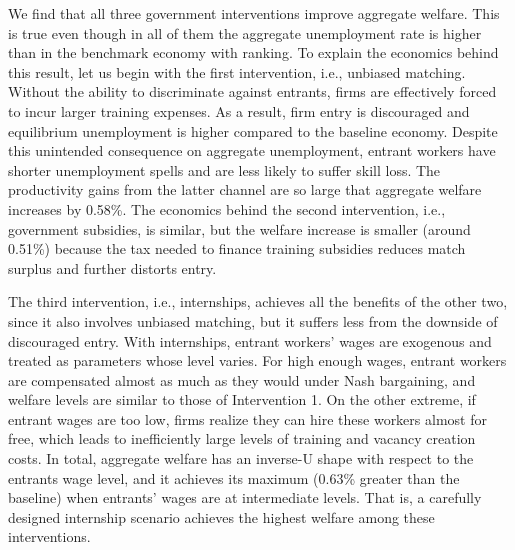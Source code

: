 \documentclass[12pt]{article} %
\theoremstyle{definition}
\begin{document}
We find that all three government interventions improve aggregate welfare.%
This is true even though in all of them the aggregate unemployment rate is higher than in the benchmark economy with ranking.
To explain the economics behind this result, let us begin with the first intervention, i.e., unbiased matching.
Without the ability to discriminate against entrants, firms are effectively forced to incur larger training expenses.
As a result, firm entry is discouraged and equilibrium unemployment is higher compared to the baseline economy.
Despite this unintended consequence on aggregate unemployment, entrant workers have shorter unemployment spells and are less likely to suffer skill loss.
The productivity gains from the latter channel are so large that aggregate welfare increases by 0.58\%. %
The economics behind the second intervention, i.e., government subsidies, is similar, but the welfare increase is smaller (around 0.51\%) because the tax needed to finance training subsidies reduces match surplus and further distorts entry.

The third intervention, i.e., internships, achieves all the benefits of the other two, since it also involves unbiased matching, but it suffers less from the downside of discouraged entry. With internships, entrant workers' wages are exogenous and treated as parameters whose level varies.
For high enough wages, entrant workers are compensated almost as much as they would under Nash bargaining, and welfare levels are similar to those of Intervention 1.
On the other extreme, if entrant wages are too low, firms realize they can hire these workers almost for free, which leads to inefficiently large levels of training and vacancy creation costs. 
In total, aggregate welfare has an inverse-U shape with respect to the entrants wage level, and it achieves its maximum (0.63\% greater than the baseline) when entrants' wages are at intermediate levels. 
That is, a carefully designed internship scenario achieves the highest welfare among these interventions.

\end{document}
